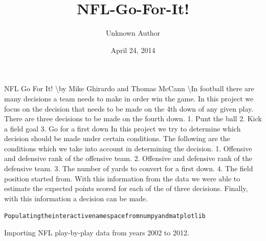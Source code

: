 \documentclass[letterpaper,10pt,english]{/anaconda/lib/python2.7/site-packages/sphinx/texinputs/sphinxhowto}
\title{NFL-Go-For-It!}
\date{April 24, 2014}
\author{Unknown Author}
\newenvironment{InvisibleVerbatim}
        {\begin{mdframed}[leftmargin=0.1\linewidth,innerleftmargin=3pt,innerrightmargin=3pt, userdefinedwidth=1\linewidth, linewidth=0pt, linecolor=white, usetwoside=false]}
        {\end{mdframed}}
\begin{document}
        
            \maketitle
        

        


        
        NFL Go For It! \textbackslash{}by Mike Ghirardo and Thomas McCann \textbackslash{}In football there are many decisions a team needs to make in order win
the game. In this project we focus on the decision that needs to be made
on the 4th down of any given play. There are three decisions to be made
on the fourth down. 1. Punt the ball 2. Kick a field goal 3. Go for a
first down In this project we try to determine which decision should be
made under certain conditions. The following are the conditions which we
take into account in determining the decision. 1. Offensive and
defensive rank of the offensive team. 2. Offensive and defensive rank of
the defensive team. 3. The number of yards to convert for a first down.
4. The field position started from. With this information from the data
we were able to estimate the expected points scored for each of the of
three decisions. Finally, with this information a decision can be made.

    

        
        

            
                \begin{InvisibleVerbatim}
                \vspace{-0.5\baselineskip}
\begin{alltt}Populating the interactive namespace from numpy and matplotlib
\end{alltt}

            \end{InvisibleVerbatim}
            
        
    
Importing NFL play-by-play data from years 2002 to 2012.

    

        
\end{document}
